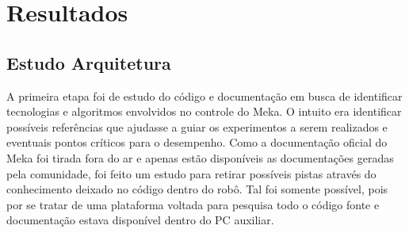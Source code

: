\chapter{Resultados\label{ch:results}}







\section{Estudo Arquitetura}

A primeira etapa foi de estudo do código e documentação em busca de identificar tecnologias e algoritmos envolvidos no controle do Meka. O intuito era identificar possíveis referências que ajudasse a guiar os experimentos a serem realizados e eventuais pontos críticos para o desempenho. Como a documentação oficial do Meka foi tirada fora do ar e apenas estão disponíveis as documentações geradas pela comunidade, foi feito um estudo para retirar possíveis pistas através do conhecimento deixado no código dentro do robô. Tal foi somente possível, pois por se tratar de uma plataforma voltada para pesquisa todo o código fonte e documentação estava disponível dentro do PC auxiliar.

